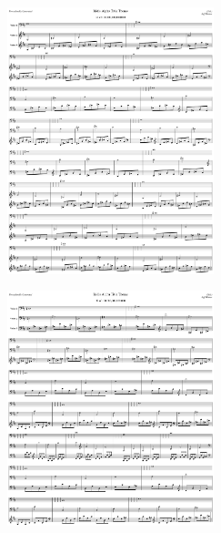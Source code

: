 \begin{figure}[H]                                             
{                                                             
  \setlength{\tabcolsep}{3.0pt}                               
  \setlength\cmidrulewidth{\heavyrulewidth} %
    \begin{subfigure}{0.5\textwidth}                            
  \includegraphics[width=6cm]{music/title_no_31_page_1001.png}%
    \end{subfigure}                                             
  \begin{subfigure}{0.5\textwidth}                            
  \includegraphics[width=6cm]{music/title_no_32_page_1001.png}%
    \end{subfigure}                                             
}                                                             
\end{figure}                                                  


